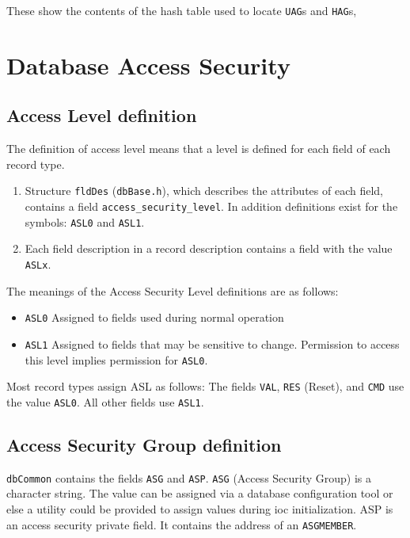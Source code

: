 These show the contents of the hash table used to locate \verb|UAG|s and \verb|HAG|s,

\section{Database Access Security}

\subsection{Access Level definition}

The definition of access level means that a level is defined for each field of each record type.

\begin{enumerate}
\item Structure \verb|fldDes| (\verb|dbBase.h|), which describes the attributes of each field, contains a field \verb|access_security_level|. In addition definitions exist for the symbols: \verb|ASL0| and \verb|ASL1|.

\item Each field description in a record description contains a field with the value \verb|ASLx|.
\end{enumerate}

The meanings of the Access Security Level definitions are as follows:

\begin{itemize}
\item \verb|ASL0| Assigned to fields used during normal operation

\item \verb|ASL1| Assigned to fields that may be sensitive to change. Permission to access this level implies permission for 
\verb|ASL0|.
\end{itemize}

Most record types assign ASL as follows: The fields \verb|VAL|, \verb|RES| (Reset), and \verb|CMD| use the value \verb|ASL0|. All other fields use 
\verb|ASL1|.

\subsection{Access Security Group definition}

\verb|dbCommon| contains the fields \verb|ASG| and \verb|ASP|. \verb|ASG| (Access Security Group) is a character string. The value can be 
assigned via a database configuration tool or else a utility could be provided to assign values during ioc initialization. ASP 
is an access security private field. It contains the address of an \verb|ASGMEMBER|.

